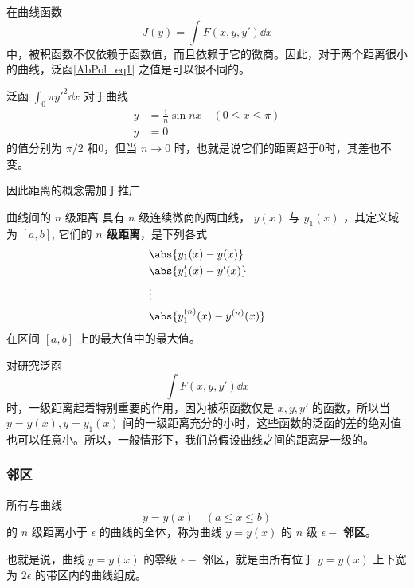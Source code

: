 在曲线函数
\begin{equation}\label{AbPol_eq1}
J(y)=\int F(x,y,y')\dd x
\end{equation}
中，被积函数不仅依赖于函数值，而且依赖于它的微商。因此，对于两个距离很小的曲线，泛函\autoref{AbPol_eq1} 之值是可以很不同的。
\begin{example}{}
泛函 $\int_0\pi y'^2\dd x$ 对于曲线
\begin{equation}
\begin{aligned}
y&=\frac{1}{n}\sin nx\quad (0\leq x\leq \pi)\\
y&=0
\end{aligned}
\end{equation}
的值分别为 $\pi/2$ 和0，但当 $n\rightarrow 0$ 时，也就是说它们的距离趋于0时，其差也不变。
\end{example}

因此距离的概念需加于推广
\begin{definition}{曲线间的 $n$ 级距离}\label{AbPol_def1}
具有 $n$ 级连续微商的两曲线， $y(x)$ 与 $y_1(x)$ ，其定义域为 $[a,b]$, 它们的 \textbf{$n$ 级距离}，是下列各式
\begin{equation}
\begin{aligned}
&\abs{y_1(x)-y(x)}\\
&\abs{y_1'(x)-y'(x)}\\
&\vdots\\
&\abs{y_1^{(n)}(x)-y^{(n)}(x)}\\
\end{aligned}
\end{equation}
在区间 $[a,b]$ 上的最大值中的最大值。
\end{definition}

对研究泛函
\begin{equation}
\int F(x,y,y')\dd x
\end{equation}
时，一级距离起着特别重要的作用，因为被积函数仅是 $x,y,y'$ 的函数，所以当 $y=y(x),y=y_1(x)$ 间的一级距离充分的小时，这些函数的泛函的差的绝对值也可以任意小。所以，一般情形下，我们总假设曲线之间的距离是一级的。
\subsubsection{邻区}
所有与曲线
\begin{equation}
y=y(x)\quad (a\leq x\leq b)
\end{equation}
 的 $n$ 级距离小于 $\epsilon$ 的曲线的全体，称为曲线 $y=y(x)$ 的 $n$ 级 $\epsilon -$ \textbf{邻区}。 
 
 也就是说，曲线 $y=y(x)$ 的零级 $\epsilon-$ 邻区，就是由所有位于 $y=y(x)$ 上下宽为 $2\epsilon$ 的带区内的曲线组成。

